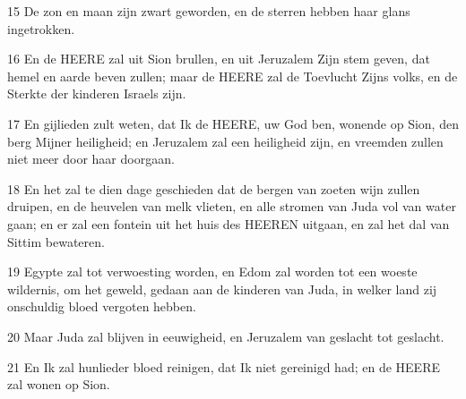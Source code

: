 \par 15 De zon en maan zijn zwart geworden, en de sterren hebben haar glans ingetrokken.
\par 16 En de HEERE zal uit Sion brullen, en uit Jeruzalem Zijn stem geven, dat hemel en aarde beven zullen; maar de HEERE zal de Toevlucht Zijns volks, en de Sterkte der kinderen Israels zijn.
\par 17 En gijlieden zult weten, dat Ik de HEERE, uw God ben, wonende op Sion, den berg Mijner heiligheid; en Jeruzalem zal een heiligheid zijn, en vreemden zullen niet meer door haar doorgaan.
\par 18 En het zal te dien dage geschieden dat de bergen van zoeten wijn zullen druipen, en de heuvelen van melk vlieten, en alle stromen van Juda vol van water gaan; en er zal een fontein uit het huis des HEEREN uitgaan, en zal het dal van Sittim bewateren.
\par 19 Egypte zal tot verwoesting worden, en Edom zal worden tot een woeste wildernis, om het geweld, gedaan aan de kinderen van Juda, in welker land zij onschuldig bloed vergoten hebben.
\par 20 Maar Juda zal blijven in eeuwigheid, en Jeruzalem van geslacht tot geslacht.
\par 21 En Ik zal hunlieder bloed reinigen, dat Ik niet gereinigd had; en de HEERE zal wonen op Sion.


